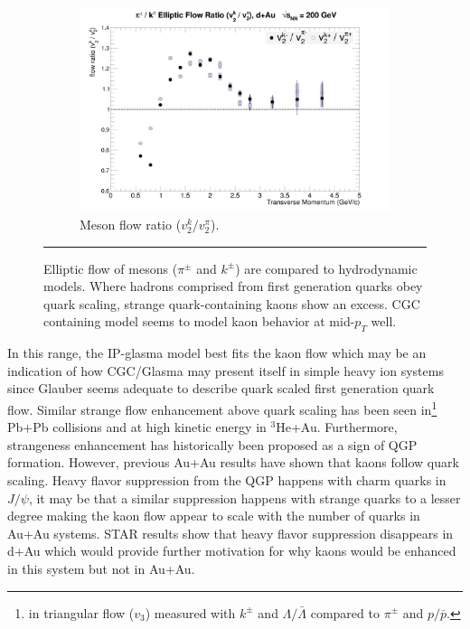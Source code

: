 \begin{figure}[hbtp]
\begin{subfigure}[h]{0.48\textwidth}
	\end{subfigure}
	\begin{subfigure}[h]{0.48\textwidth}
    \centering
    \includegraphics[width=1\textwidth]{results/v2mesonratio.jpg}
    \caption{Meson flow ratio ($v_2^{k} / v_2^{\pi}$).}
    \label{fig:mesonratio}

	\end{subfigure}

    \rule{35em}{0.5pt}
    \caption[Meson Elliptic Flow plots]{Elliptic flow of mesons ($\pi^{\pm}$ and $k^{\pm}$) are compared to hydrodynamic models. Where hadrons comprised from first generation quarks obey quark scaling, strange quark-containing kaons show an excess. CGC containing model seems to model kaon behavior at mid-$p_T$ well.}
    \label{fig:qscaledhydro}
\end{figure}

In this range, the IP-glasma model best fits the kaon flow which may be an indication of how CGC/Glasma may present itself in simple heavy ion systems since Glauber seems adequate to describe quark scaled first generation quark flow. Similar strange flow enhancement above quark scaling has been seen in\footnote{in triangular flow ($v_3$) measured with $k^{\pm}$ and $\Lambda/\bar{\Lambda}$ compared to $\pi^{\pm}$ and $p/\bar{p}$.} Pb+Pb collisions\citep{1742-6596-668-1-012099} and at high kinetic energy in $^3$He+Au\citep{huangQM2015}. Furthermore, strangeness enhancement has historically been proposed as a sign of QGP formation\citep{PhysRevLett.48.1066}. However, previous Au+Au results have shown that kaons follow quark scaling\citep{PhysRevC.92.034913}. Heavy flavor suppression from the QGP happens with charm quarks in $J/\psi$, it may be that a similar suppression happens with strange quarks to a lesser degree making the kaon flow appear to scale with the number of quarks in Au+Au systems. STAR results show that heavy flavor suppression disappears in d+Au\citep{Powell:2010oea} which would provide further motivation for why kaons would be enhanced in this system but not in Au+Au.  

